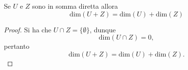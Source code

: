 \begin{cor}
    Se $U$ e $Z$ sono in somma diretta allora
    $$
        \text{dim}(U + Z) = \text{dim}(U) + \text{dim}(Z)
    $$
\end{cor}
\begin{proof}
    Si ha che $U \cap Z = \{ \emptyset \}$, dunque
    $$
        \text{dim}(U \cap Z) = 0,
    $$
    pertanto
    $$
        \text{dim}(U + Z) = \text{dim}(U) + \text{dim}(Z).
    $$
\end{proof}